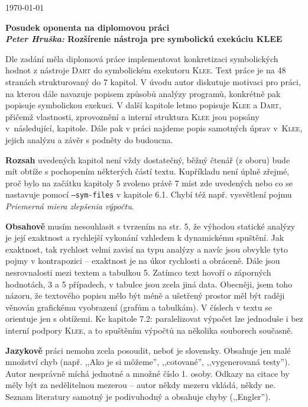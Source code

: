 \documentclass{article}
\begin{document}
\begin{flushright}
\today
\end{flushright}
\begin{center}
\Large\textbf{Posudek oponenta na diplomovou práci \\
\normalsize%
\textit{Peter Hruška:} Rozšírenie nástroja pre symbolickú exekúciu KLEE}
\end{center}

Dle zadání měla diplomová práce implementovat konkretizaci symbolických hodnot
z nástroje \textsc{Dart} do symbolickém exekutoru \textsc{Klee}. Text práce je
na 48 stranách strukturovaný do 7 kapitol. V úvodu autor diskutuje motivaci
pro práci, na kterou dále navazuje popisem způsobů analýzy programů, konkrétně
pak popisuje symbolickou exekuci. V další kapitole letmo popisuje
\textsc{Klee} a \textsc{Dart}, přičemž vlastnosti, zprovoznění a interní
struktura \textsc{Klee} jsou popsány v~následující, kapitole. Dále pak v práci
najdeme popis samotných úprav v~\textsc{Klee}, jejich analýzu a závěr s
podněty do budoucna.

\textbf{Rozsah} uvedených kapitol není vždy dostatečný, běžný čtenář (z oboru)
bude mít obtíže s pochopením některých částí textu. Kupříkladu není úplně
zřejmé, proč bylo na začátku kapitoly 5 zvoleno právě 7 míst zde uvedených
nebo co se nastavuje pomocí \texttt{--sym-files} v kapitole 6.1. Chybí též
např. vysvětlení pojmu \emph{Priemerná miera zlepšenia výpočtu}.

\textbf{Obsahově} musím nesouhlasit s tvrzením na str. 5, že výhodou statické
analýzy je její exaktnost a rychlejší vykonání vzhledem k dynamickému
spuštění. Jak exaktnost, tak rychlost velmi zavisí na typu analýzy a navíc
jsou obvykle tyto pojmy v kontrapozici -- exaktnost je na úkor rychlosti a
obráceně. Dále jsou nesrovnalosti mezi textem a tabulkou 5. Zatímco text
hovoří o záporných hodnotách, 3 a 5 případech, v tabulce jsou zcela jiná data.
Obecněji, jsem toho názoru, že textového popisu mělo být méně a ušetřený
prostor měl být raději věnován grafickému vyobrazení (grafům a tabulkám). V
číslech v textu se orientuje jen s obtížemi. Ke kapitole 7.2: paralelizovat
výpočet lze jednoduše i bez interní podpory \textsc{Klee}, a to spuštěním
výpočtů na několika souborech současně.

\textbf{Jazykově} práci nemohu zcela posoudit, neboť je slovensky. Obsahuje
jen malé množství chyb (např. ,,Ako je si môžeme'', ,,cotované'',
,,vygenerovaná testy''). Autor nesprávně míchá jednotné a množné číslo 1.
osoby. Odkazy na citace by měly být za nedělitelnou mezerou -- autor někdy
mezeru vkládá, někdy ne. Seznam literatury samotný je podivuhodný a obsahuje
chyby (,,Engle\hspace{1ex}r'').
\end{document}
